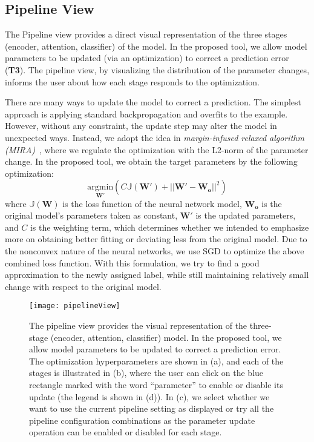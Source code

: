 \subsection{Pipeline View}
\label{sec:pipeline}
The Pipeline view provides a direct visual representation of the three stages (encoder, attention, classifier) of the model. In the proposed tool, we allow model parameters to be updated (via an optimization) to correct a prediction error (\textbf{T3}). The pipeline view, by visualizing the distribution of the parameter changes, informs the user about how each stage responds to the optimization.

There are many ways to update the model to correct a prediction. The simplest approach is applying standard backpropagation and overfits to the example. However, without any constraint, the update step may alter the model in unexpected ways.
Instead, we adopt the idea in \emph{margin-infused relaxed algorithm (MIRA)}~\cite{CrammerSinger2003}, where we regulate the optimization with the L2-norm of the parameter change. In the proposed tool, we obtain the target parameters by the following optimization:
\begin{equation}
\underset{\mathbf{W}'}{\mathrm{argmin}}( C \mathbb{J}(\mathbf{W}') + ||\mathbf{W}' - \mathbf{W_o}||^2)
\end{equation}
where $\mathbb{J}(\mathbf{W})$ is the loss function of the neural network model, $\mathbf{W_o}$ is the original model's parameters taken as constant, $\mathbf{W}'$ is the updated parameters, and $C$ is the weighting term, which determines whether we intended to emphasize more on obtaining better fitting or deviating less from the original model. Due to the nonconvex nature of the neural networks, we use SGD to optimize the above combined loss function.
%
With this formulation, we try to find a good approximation to the newly assigned label, while still maintaining relatively small change with respect to the original model.

\begin{figure}[htbp]
\centering
\vspace{-2mm}
 \texttt{[image: pipelineView]}
 \vspace{-2mm}
 \caption{
The pipeline view provides the visual representation of the three-stage (encoder, attention, classifier) model. 
%
In the proposed tool, we allow model parameters to be updated to correct a prediction error. 
The optimization hyperparameters are shown in (a), and each of the stages is illustrated in (b), where the user can click on the blue rectangle marked with the word ``parameter'' to enable or disable its update (the legend is shown in (d)). In (c), we select whether we want to use the current pipeline setting as displayed or try all the pipeline configuration combinations as the parameter update operation can be enabled or disabled for each stage.
 }
\label{fig:pipelineView}
\vspace{-2mm}
\end{figure}

